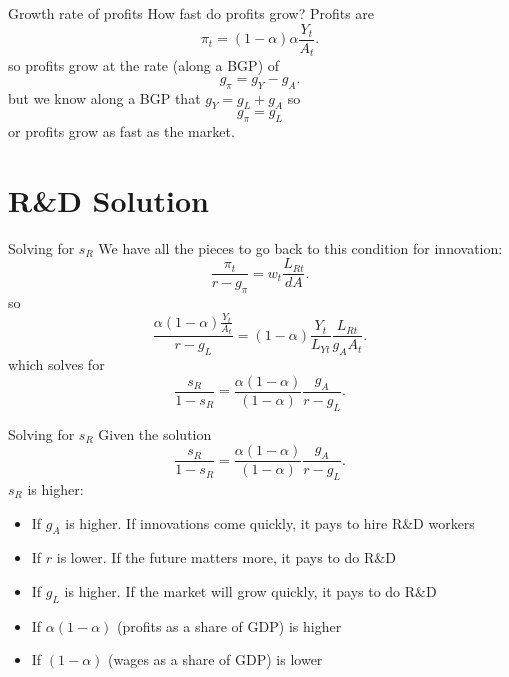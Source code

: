 \begin{frame}{Growth rate of profits}
How fast do profits grow? Profits are
\begin{equation}
	\pi_t = (1-\alpha) \alpha \frac{Y_t}{A_t}.\label{EQ_pi_j}
\end{equation}
so profits grow at the rate (along a BGP) of
\begin{equation}
	g_{\pi} = g_Y - g_A. \nonumber
\end{equation}
but we know along a BGP that $g_Y = g_L + g_A$ so
\begin{equation}
	g_{\pi} = g_L
\end{equation}
or profits grow as fast as the market.
\end{frame}

\section{R\&D Solution}
\begin{frame}{Solving for $s_R$}
We have all the pieces to go back to this condition for innovation:
\begin{equation}
	\frac{\pi_t}{r-g_{\pi}} = w_t \frac{L_{Rt}}{dA}. \nonumber
\end{equation}
so 
\begin{equation}
	\frac{\alpha(1-\alpha) \frac{Y_t}{A_t}}{r-g_L} = (1-\alpha)\frac{Y_t}{L_{Yt}} \frac{L_{Rt}}{g_A A_t}. \nonumber
\end{equation}
which solves for
\begin{equation}
	\frac{s_R}{1-s_R} = \frac{\alpha(1-\alpha)}{(1-\alpha)}\frac{g_A}{r-g_L}. \label{EQ_sR_romer}
\end{equation}

\end{frame}

\begin{frame}{Solving for $s_R$}
Given the solution
\begin{equation}
	\frac{s_R}{1-s_R} = \frac{\alpha(1-\alpha)}{(1-\alpha)}\frac{g_A}{r-g_L}. \label{EQ_sR_romer}
\end{equation}
$s_R$ is higher:
\begin{itemize}
	\item If $g_A$ is higher. If innovations come quickly, it pays to hire R\&D workers
	\item If $r$ is lower. If the future matters more, it pays to do R\&D
	\item If $g_L$ is higher. If the market will grow quickly, it pays to do R\&D
	\item If $\alpha(1-\alpha)$ (profits as a share of GDP) is higher
	\item If $(1-\alpha)$ (wages as a share of GDP) is lower
\end{itemize}
\end{frame}

